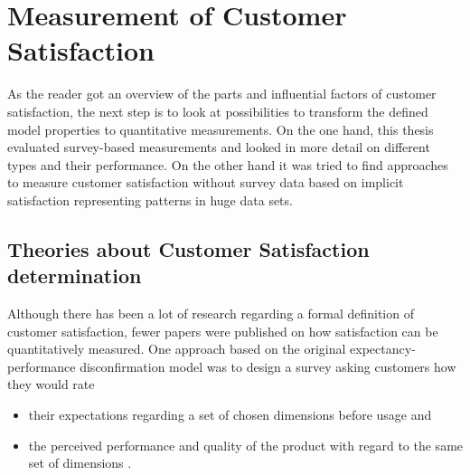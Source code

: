 \section{Measurement of Customer Satisfaction}
As the reader got an overview of the parts and influential factors of customer satisfaction, the next step is to look at possibilities to transform the defined model properties to quantitative measurements. On the one hand, this thesis evaluated survey-based measurements and looked in more detail on different types and their performance. On the other hand it was tried to find approaches to measure customer satisfaction without survey data based on implicit satisfaction representing patterns in huge data sets. 

\subsection{Theories about Customer Satisfaction determination}
\label{ssec:custSatTheories}
Although there has been a lot of research regarding a formal definition of customer satisfaction, fewer papers were published on how satisfaction can be quantitatively measured. One approach based on the original expectancy-performance disconfirmation model was to design a survey asking customers how they would rate

\begin{itemize}
	\item their expectations regarding a set of chosen dimensions before usage and
	\item the perceived performance and quality of the product with regard to the same set of dimensions \cite{prakash1983reliability}.
\end{itemize}

